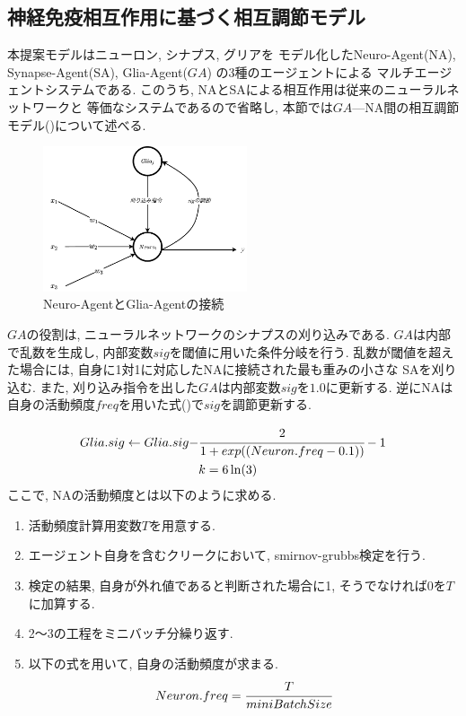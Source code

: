 \documentclass[a4paper,10.5pt,twocolumn]{jsarticle}
\begin{document}
\subsection{神経免疫相互作用に基づく相互調節モデル}
本提案モデルはニューロン, シナプス, グリアを
モデル化したNeuro-Agent(NA), Synapse-Agent(SA), Glia-Agent($GA$)
の3種のエージェントによる
マルチエージェントシステムである.
このうち, NAとSAによる相互作用は従来のニューラルネットワークと
等価なシステムであるので省略し, 本節では$GA$---NA間の相互調節モデル()について述べる.
\vspace{-2zh}
\begin{figure}[H]
  \centering
  \includegraphics[width=6cm]{NeuroGlia.pdf}
  \caption{Neuro-AgentとGlia-Agentの接続}
  \label{fig:NeuroGlia}
\end{figure}
\vspace{-2zh}
$GA$の役割は, ニューラルネットワークのシナプスの刈り込みである. 
$GA$は内部で乱数を生成し, 内部変数$sig$を閾値に用いた条件分岐を行う.
乱数が閾値を超えた場合には, 自身に1対1に対応したNAに接続された最も重みの小さな
SAを刈り込む. 
また, 刈り込み指令を出した$GA$は内部変数$sig$を$1.0$に更新する.
逆にNAは自身の活動頻度$freq$を用いた式()で$sig$を調節更新する.

\begin{align}
  Glia.sig\leftarrow Glia.sig-&\displaystyle \cfrac{2}{1+exp((Neuron.freq-0.1))}-1\\
  &k=6\ln(3)
  \label{eq:new}
\end{align}
ここで, NAの活動頻度とは以下のように求める.
\begin{enumerate}
  \item 活動頻度計算用変数$T$を用意する.
  \item エージェント自身を含むクリークにおいて, 
  smirnov-grubbs検定を行う.
  \item 検定の結果, 自身が外れ値であると判断された場合に1, そうでなければ0を$T$に加算する.
  \item 2〜3の工程をミニバッチ分繰り返す.
  \item 以下の式を用いて, 自身の活動頻度が求まる.
  \vspace{-2zh}
  \begin{align}
    Neuron.freq=\cfrac{T}{miniBatchSize}
  \end{align}
\end{enumerate} 
\end{document}
